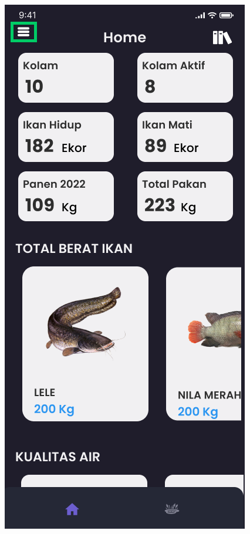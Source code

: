 \begin{spacing}{1.5}
	\begin{figure}[H]
		\hspace{.15\linewidth}
			\includegraphics[width=\linewidth]{gambar/sprint1/mockup_dashboard.png}

\end{figure}
\end{spacing}
